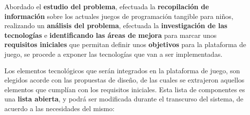 Abordado el \textbf{estudio del problema}, efectuada la \textbf{recopilación de información} sobre los actuales juegos de programación tangible para niños, realizando un \textbf{análisis del problema}, efectuada la \textbf{investigación de las tecnologías} e \textbf{identificando las áreas de mejora} para marcar unos \textbf{requisitos iniciales} que permitan definir unos \textbf{objetivos} para la plataforma de juego, se procede a exponer las tecnologías que van a ser implementadas.\ 

Los elementos tecnológicos que serán integrados en la plataforma de juego, son elegidos acorde con las propuestas de diseño, de las cuales se extrajeron aquellos elementos que cumplían con los requisitos iniciales. Esta lista de componentes es una \textbf{lista abierta}, y podrá ser modificada durante el transcurso del sistema, de acuerdo a las necesidades del mismo:

